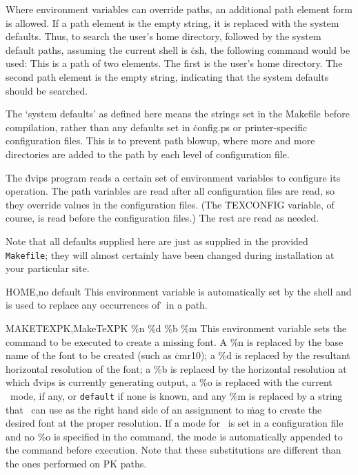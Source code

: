 Where environment variables can override paths, an additional path
element form is allowed.  If a path element is the empty string, it
is replaced with the system defaults.  Thus, to
search the user's home directory, followed by the system
default paths, assuming the current shell is \.{csh},
the following command would be used:
\noindent
This is a path of two elements.  The first is the user's home directory.
The second path element is the empty string, indicating that
the system defaults should be searched.

The `system defaults' as defined here means the strings set in the
\.{Makefile} before compilation, rather than any defaults set in
\.{config.ps} or printer-specific configuration files.	This is to
prevent path blowup, where more and more directories are added to the
path by each level of configuration file.


The \.{dvips} program reads a certain set of environment variables to
configure its operation.  The path variables are read after all
configuration files are read, so they override values in the configuration
files.	(The \.{TEXCONFIG} variable, of course, is read before the
configuration files.)  The rest are read as needed.

Note that all defaults supplied here are just as supplied in the
provided {\tt Makefile}; they will almost certainly have been changed
during installation at your particular site.

\descenv HOME,{\rm no default}
  This environment variable is automatically set by the shell and is
used to replace any occurrences of \.{\tilde} in a path.

\descenv MAKETEXPK,{MakeTeXPK \%n \%d \%b \%m}
This environment variable sets the command to be executed to create
a missing font.  A \%n is replaced by the base name of the font to
be created (such as \.{cmr10}); a \%d is replaced by the resultant
horizontal resolution of the font; a \%b is replaced by the
horizontal resolution at which \.{dvips} is currently generating
output, a \%o is replaced with the current \MF\ mode, if any,
or {\tt default} if none is known,
and any \%m is replaced by a string that \MF\ can use as
the right hand side of an assignment to \.{mag} to create the
desired font at the proper resolution.	If a mode for \MF\ is set in
a configuration file and no \%o is specified in the command,
the mode is automatically appended to the command
before execution.  Note that these substitutions are different than
the ones performed on PK paths.

